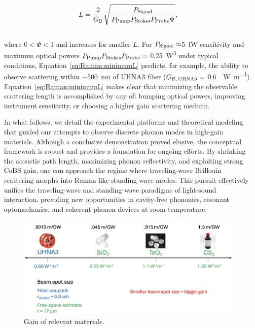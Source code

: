 \begin{equation}
  L = \frac{2}{G_{\rm B}}\sqrt{\frac{P_{\rm Signal}}{P_{\rm Pump}P_{\rm Stokes}P_{\rm Probe}\Phi}},
  \label{eq:Raman:minimumL}
\end{equation}
\\
where \(0 < \Phi < 1\) and increases for smaller \(L\). For \(P_{\rm Signal}\approx\)\SI{5}{\femto\watt} sensitivity and maximum optical powers \(P_{\rm Pump}P_{\rm Stokes}P_{\rm Probe}=\) \SI{0.25}{\cubic\watt} under typical conditions, Equation~\ref{eq:Raman:minimumL} predicts, for example, the ability to observe scattering within \(\sim\)\SI{500}{\nano\meter} of \ac{UHNA3} fiber (\(G_{\rm B,\,UHNA3}=\) \SI{0.6}{\per\watt\per\meter}). Equation~\ref{eq:Raman:minimumL} makes clear that minimizing the observable scattering length is accomplished by any of: bumping optical powers, improving instrument sensitivity, or choosing a higher gain scattering medium.

In what follows, we detail the experimental platforms and theoretical modeling that guided our attempts to observe discrete phonon modes in high-gain materials. Although a conclusive demonstration proved elusive, the conceptual framework is robust and provides a foundation for ongoing efforts. By shrinking the acoustic path length, maximizing phonon reflectivity, and exploiting strong \ac{CoBS} gain, one can approach the regime where traveling-wave Brillouin scattering morphs into Raman-like standing-wave modes. This pursuit effectively unifies the traveling-wave and standing-wave paradigms of light-sound interaction, providing new opportunities in cavity-free phononics, resonant optomechanics, and coherent phonon devices at room temperature.

\begin{figure}[t]
  \centering
  \includegraphics[width=\textwidth]{figs/4-Raman/GainOfRelevantMaterials.png}
  \caption{Gain of relevant materials.}
  \label{fig:Raman:GainOfRelevantMaterials}
\end{figure}

